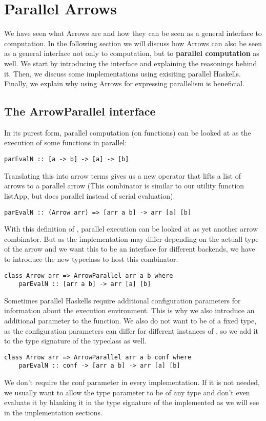 \section{Parallel Arrows}
We have seen what Arrows are and how they can be seen as a general interface to computation. In the following section we will discuss how Arrows can also be seen as a general interface not only to computation, but to \textbf{parallel computation} as well. We start by introducing the interface and explaining the reasonings behind it. Then, we discuss some implementations using exisiting parallel Haskells. Finally, we explain why using Arrows for expressing parallelism is beneficial.
\subsection{The ArrowParallel interface}
In its purest form, parallel computation (on functions) can be looked at as the execution of some functions  in parallel:
\begin{lstlisting}[frame=htrbl]
parEvalN :: [a -> b] -> [a] -> [b]
\end{lstlisting}
Translating this into arrow terms gives us a new operator  that lifts a list of arrows \code{[arr a b]} to a parallel arrow  (This combinator is similar to our utility function listApp, but does parallel instead of serial evaluation).
\begin{lstlisting}[frame=htrbl]
parEvalN :: (Arrow arr) => [arr a b] -> arr [a] [b]
\end{lstlisting}
With this definition of , parallel execution can be looked at as yet another arrow combinator. But as the implementation may differ depending on the actuall type of the arrow  and we want this to be an interface for different backends, we have to introduce the new typeclass  to host this combinator.
\begin{lstlisting}[frame=htrbl]
class Arrow arr => ArrowParallel arr a b where
	parEvalN :: [arr a b] -> arr [a] [b]
\end{lstlisting}
Sometimes parallel Haskells require additional configuration parameters for information about the execution environment. This is why we also introduce an additional  parameter to the function. We also do not want  to be of a fixed type, as the configuration parameters can differ for different instances of , so we add it to the type signature of the typeclass as well.
\begin{lstlisting}[frame=htrbl]
class Arrow arr => ArrowParallel arr a b conf where
	parEvalN :: conf -> [arr a b] -> arr [a] [b]
\end{lstlisting}
We don't require the conf parameter in every implementation. If it is not needed, we usually want to allow the  type parameter to be of any type and don't even evaluate it by blanking it in the type signature of the implemented  as we will see in the implementation sections.

